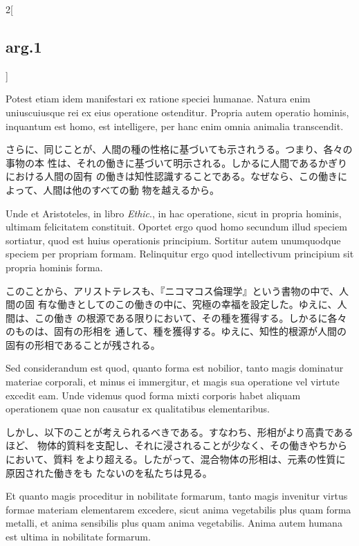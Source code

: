 \documentclass[paper=a4paper,fontsize=10pt,jafontsize=9pt,titlepage]{jlreq}
\begin{document}
\begin{paracol}{2}[\subsection{arg.1}]
\switchcolumn*

 Potest etiam idem manifestari ex ratione speciei humanae. Natura enim
 uniuscuiusque rei ex eius operatione ostenditur. Propria autem operatio
 hominis, inquantum est homo, est intelligere, per hanc enim omnia animalia
 transcendit.
 
\switchcolumn

さらに、同じことが、人間の種の性格に基づいても示されうる。つまり、各々の事物の本
性は、それの働きに基づいて明示される。しかるに人間であるかぎりにおける人間の固有
の働きは知性認識することである。なぜなら、この働きによって、人間は他のすべての動
物を越えるから。
 
\switchcolumn*

 Unde et Aristoteles, in libro {\itshape Ethic}., in hac operatione, sicut in
 propria hominis, ultimam felicitatem constituit. Oportet ergo quod homo
 secundum illud speciem sortiatur, quod est huius operationis
 principium. Sortitur autem unumquodque speciem per propriam formam. Relinquitur
 ergo quod intellectivum principium sit propria hominis forma.
 
\switchcolumn

 このことから、アリストテレスも、『ニコマコス倫理学』という書物の中で、人間の固
 有な働きとしてのこの働きの中に、究極の幸福を設定した。ゆえに、人間は、この働き
 の根源である限りにおいて、その種を獲得する。しかるに各々のものは、固有の形相を
 通して、種を獲得する。ゆえに、知性的根源が人間の固有の形相であることが残される。
 
\switchcolumn*

 Sed considerandum est quod, quanto forma est nobilior, tanto magis dominatur
 materiae corporali, et minus ei immergitur, et magis sua operatione vel virtute
 excedit eam. Unde videmus quod forma mixti corporis habet aliquam operationem
 quae non causatur ex qualitatibus elementaribus.
 
\switchcolumn

 しかし、以下のことが考えられるべきである。すなわち、形相がより高貴であるほど、
 物体的質料を支配し、それに浸されることが少なく、その働きやちからにおいて、質料
 をより超える。したがって、混合物体の形相は、元素の性質に原因された働きをも
 たないのを私たちは見る。
 
\switchcolumn*

 Et quanto magis proceditur in nobilitate formarum, tanto magis invenitur virtus
 formae materiam elementarem excedere, sicut anima vegetabilis plus quam forma
 metalli, et anima sensibilis plus quam anima vegetabilis. Anima autem humana
 est ultima in nobilitate formarum.
 

\end{paracol}
\end{document}
